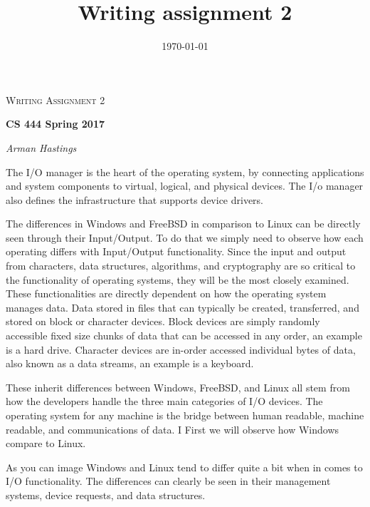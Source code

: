 \documentclass[letterpaper,10pt,draftclsnofoot,onecolumn]{IEEEtran}
\title{Writing assignment 2}
\def\name{Arman Hastings}
\begin{document}
\begin{titlepage}
   \centering
	{\scshape\Large Writing Assignment 2\par}
	\vspace{1.5cm}
	{\huge\bfseries CS 444 Spring 2017\par}
	\vspace{2cm}
	{\Large\itshape \name \par}
    
    \date{\today}
    
    \vspace{2cm}
    
    
    
    
    
\end{titlepage}

The I/O manager is the heart of the operating system, by connecting  applications and system components to virtual, logical, and physical devices. The I/o manager also defines the infrastructure that supports device drivers.

The differences in Windows and FreeBSD in comparison to Linux can be directly seen through their Input/Output. To do that we simply need to observe how each operating differs with Input/Output functionality. Since the input and output from characters, data structures, algorithms, and cryptography are so critical to the functionality of operating systems, they will be the most closely examined. These functionalities are directly dependent on how the operating system manages data. Data stored in files that can typically be created, transferred, and stored on block or character devices. Block devices are simply randomly accessible fixed size chunks of data that can be accessed in any order, an example is a hard drive. Character devices are in-order accessed individual bytes of data, also known as a data streams, an example is a keyboard.

These inherit differences between Windows, FreeBSD, and Linux all stem from how the developers handle the three main categories of I/O devices. The operating system for any machine is the bridge between human readable, machine readable, and communications of data. 
I First we will observe how Windows compare to Linux.  
\cite{}%



As you can image Windows and Linux tend to differ quite a bit when in comes to I/O functionality. The differences can clearly be seen in their management systems, device requests, and data structures. 
\end{document}
